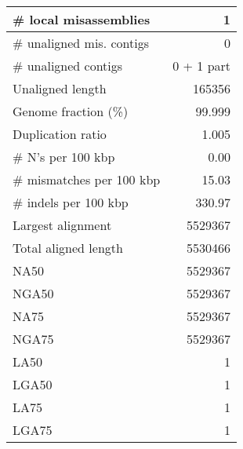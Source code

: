 \documentclass[12pt,a4paper]{article}
\begin{document}
\begin{table}[ht]
\begin{center}
\begin{tabular}{|l*{1}{|r}|}
\# local misassemblies & 1 \\ \hline
\# unaligned mis. contigs & 0 \\ \hline
\# unaligned contigs & 0 + 1 part \\ \hline
Unaligned length & 165356 \\ \hline
Genome fraction (\%) & 99.999 \\ \hline
Duplication ratio & 1.005 \\ \hline
\# N's per 100 kbp & 0.00 \\ \hline
\# mismatches per 100 kbp & 15.03 \\ \hline
\# indels per 100 kbp & 330.97 \\ \hline
Largest alignment & 5529367 \\ \hline
Total aligned length & 5530466 \\ \hline
NA50 & 5529367 \\ \hline
NGA50 & 5529367 \\ \hline
NA75 & 5529367 \\ \hline
NGA75 & 5529367 \\ \hline
LA50 & 1 \\ \hline
LGA50 & 1 \\ \hline
LA75 & 1 \\ \hline
LGA75 & 1 \\ \hline
\end{tabular}
\end{center}
\end{table}
\end{document}
